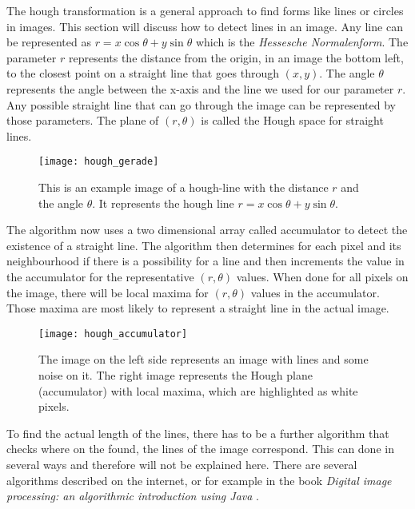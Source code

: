 The hough transformation is a general approach to find forms like lines or circles in images. This section will discuss how to detect lines in an image.
Any line can be represented as $r = x \cos \theta + y \sin \theta$ which is the \textit{Hessesche Normalenform}. The parameter $r$ represents the distance from the origin, in an image the bottom left, to the closest point on a straight line that goes through $(x,y)$. The angle $\theta$ represents the angle between the x-axis and the line we used for our parameter $r$. Any possible straight line that can go through the image can be represented by those parameters. The plane of $(r,\theta)$ is called the Hough space for straight lines.

\begin{figure}[h]
	\centering
	\texttt{[image: hough\_gerade]}
	\caption{This is an example image of a hough-line with the distance $r$ and the angle $\theta$. It represents the hough line $r = x \cos \theta + y \sin \theta$.}
	\label{fig:hough_line}
\end{figure}

The algorithm now uses a two dimensional array called accumulator to detect the existence of a straight line. The algorithm then determines for each pixel and its neighbourhood if there is a possibility for a line and then increments the value in the accumulator for the representative $(r,\theta)$ values. When done for all pixels on the image, there will be local maxima for $(r,\theta)$ values in the accumulator. Those maxima are most likely to represent a straight line in the actual image.  

\begin{figure}[h]
	\centering
	\texttt{[image: hough\_accumulator]}
	\caption{The image on the left side represents an image with lines and some noise on it. The right image represents the Hough plane (accumulator) with local maxima, which are highlighted as white pixels.}
	\label{fig:hough_accumulator}
\end{figure}

To find the actual length of the lines, there has to be a further algorithm that checks where on the found, the lines of the image correspond. This can done in several ways and therefore will not be explained here. There are several algorithms described on the internet, or for example in the book \textit{Digital image processing: an algorithmic introduction using Java} \citep{burger_burge_2016}.

\pagebreak

